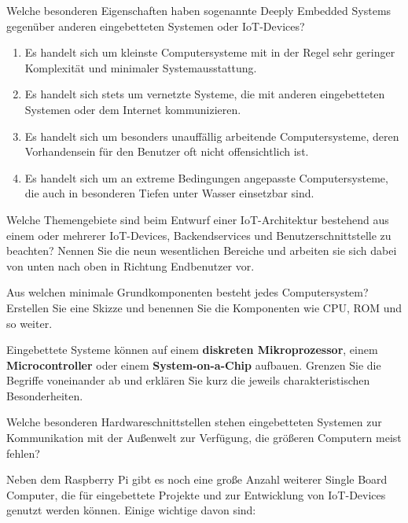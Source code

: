 \teilaufgabe
Welche besonderen Eigenschaften haben sogenannte \glqq Deeply Embedded Systems\grqq{}
gegenüber anderen eingebetteten Systemen oder IoT-Devices?

\begin{enumerate}
    \item Es handelt sich um kleinste Computersysteme mit in der Regel sehr
    geringer Komplexität und minimaler Systemausstattung.

    \item Es handelt sich stets um vernetzte Systeme, die mit anderen eingebetteten
    Systemen oder dem Internet kommunizieren.

    \item Es handelt sich um besonders unauffällig arbeitende Computersysteme,
    deren Vorhandensein für den Benutzer oft nicht offensichtlich ist.

    \item Es handelt sich um an extreme Bedingungen angepasste Computersysteme,
    die auch in besonderen Tiefen unter Wasser einsetzbar sind.
\end{enumerate}

\teilaufgabe
Welche Themengebiete sind beim Entwurf einer IoT-Architektur bestehend aus einem
oder mehrerer IoT-Devices, Backendservices und Benutzerschnittstelle zu beachten?
Nennen Sie die neun wesentlichen Bereiche und arbeiten sie sich dabei von unten
nach oben in Richtung Endbenutzer vor.

\bigskip
\teilaufgabe
Aus welchen minimale Grundkomponenten besteht jedes Computersystem? Erstellen
Sie eine Skizze und benennen Sie die Komponenten wie CPU, ROM und so weiter.

\bigskip
\teilaufgabe
Eingebettete Systeme können auf einem \textbf{diskreten Mikroprozessor},
einem \textbf{Microcontroller} oder einem \textbf{System-on-a-Chip} aufbauen.
Grenzen Sie die Begriffe voneinander ab und erklären Sie kurz die jeweils
charakteristischen Besonderheiten.

\bigskip
\teilaufgabe
Welche besonderen Hardwareschnittstellen stehen eingebetteten Systemen zur
Kommunikation mit der Außenwelt zur Verfügung, die größeren Computern meist
fehlen?

\clearpage

Neben dem Raspberry Pi gibt es noch eine große Anzahl weiterer Single Board
Computer, die für eingebettete Projekte und zur Entwicklung von IoT-Devices
genutzt werden können. Einige wichtige davon sind:

